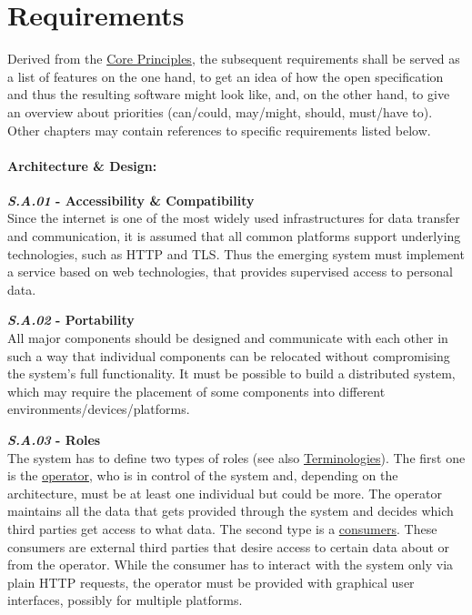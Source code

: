 \documentclass[12pt,english,a4paper,titlepage,cleardoublepage=empty,dottedtoc]{report}
\begin{document}
\hypertarget{requirements}{\chapter{Requirements}\label{requirements}}

Derived from the \protect\hyperlink{core-principles}{Core Principles},
the subsequent requirements shall be served as a list of features on the
one hand, to get an idea of how the open specification and thus the
resulting software might look like, and, on the other hand, to give an
overview about priorities (can/could, may/might, should, must/have to).
Other chapters may contain references to specific requirements listed
below.

\subsubsection*{Architecture \& Design:}\label{architecture-design}

\textbf{\emph{\protect\hypertarget{sa01}{}{S.A.01}} - Accessibility \&
Compatibility}\\
Since the internet is one of the most widely used infrastructures for
data transfer and communication, it is assumed that all common platforms
support underlying technologies, such as HTTP and TLS. Thus the emerging
system must implement a service based on web technologies, that provides
supervised access to personal data.

\textbf{\emph{\protect\hypertarget{sa02}{}{S.A.02}} - Portability}\\
All major components should be designed and communicate with each other
in such a way that individual components can be relocated without
compromising the system's full functionality. It must be possible to
build a distributed system, which may require the placement of some
components into different environments/devices/platforms.

\textbf{\emph{\protect\hypertarget{sa03}{}{S.A.03}} - Roles}\\
The system has to define two types of roles (see also
\protect\hyperlink{terminologies}{Terminologies}). The first one is the
\protect\hyperlink{terminologies--operator}{operator}, who is in control
of the system and, depending on the architecture, must be at least one
individual but could be more. The operator maintains all the data that
gets provided through the system and decides which third parties get
access to what data. The second type is a
\protect\hyperlink{terminologies--consumer}{consumers}. These consumers
are external third parties that desire access to certain data about or
from the operator. While the consumer has to interact with the system
only via plain HTTP requests, the operator must be provided with
graphical user interfaces, possibly for multiple platforms.
\end{document}
